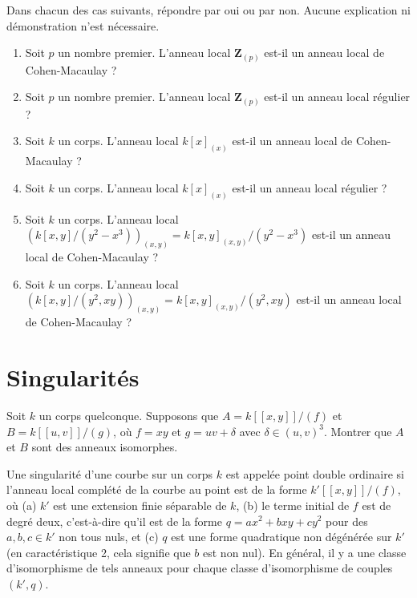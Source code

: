 \begin{exercise}
\label{exercise-examples-CM}
Dans chacun des cas suivants, répondre par oui ou par non.
Aucune explication ni démonstration n'est nécessaire.
\begin{enumerate}
\item Soit $p$ un nombre premier.
L'anneau local $\mathbf{Z}_{(p)}$ est-il un anneau local de Cohen-Macaulay ?
\item Soit $p$ un nombre premier.
L'anneau local $\mathbf{Z}_{(p)}$ est-il un anneau local régulier ?
\item Soit $k$ un corps.
L'anneau local $k[x]_{(x)}$ est-il un anneau local de Cohen-Macaulay ?
\item Soit $k$ un corps.
L'anneau local $k[x]_{(x)}$ est-il un anneau local régulier ?
\item Soit $k$ un corps.
L'anneau local $(k[x, y]/(y^2 - x^3))_{(x, y)} =
k[x, y]_{(x, y)}/(y^2 - x^3)$ est-il un anneau local de Cohen-Macaulay ?
\item Soit $k$ un corps.
L'anneau local $(k[x, y]/(y^2, xy))_{(x, y)} =
k[x, y]_{(x, y)}/(y^2, xy)$ est-il un anneau local de Cohen-Macaulay ?
\end{enumerate}
\end{exercise}













\section{Singularités}
\label{section-singularities}

\begin{exercise}
\label{exercise-singularities}
Soit $k$ un corps quelconque. Supposons que $A = k[[x, y]]/(f)$ et
$B = k[[u, v]]/(g)$, où $f = xy$ et $g = uv + \delta$ avec
$\delta \in (u, v)^3$. Montrer que $A$ et $B$ sont des anneaux isomorphes.
\end{exercise}

\begin{remark}
\label{remark-singularities}
Une singularité d'une courbe sur un corps $k$ est appelée
point double ordinaire si l'anneau local complété de la courbe au
point est de la forme $k'[[x, y]]/(f)$, où (a) $k'$ est une extension finie
séparable de $k$, (b) le terme initial de $f$ est de degré deux, c'est-à-dire qu'il
est de la forme $q = ax^2 + bxy + cy^2$ pour des $a, b, c\in k'$ non tous nuls, et
(c) $q$ est une forme quadratique non dégénérée sur $k'$ (en caractéristique 2,
cela signifie que $b$ est non nul). En général, il y a une classe d'isomorphisme
de tels anneaux pour chaque classe d'isomorphisme de couples $(k', q)$.
\end{remark}

